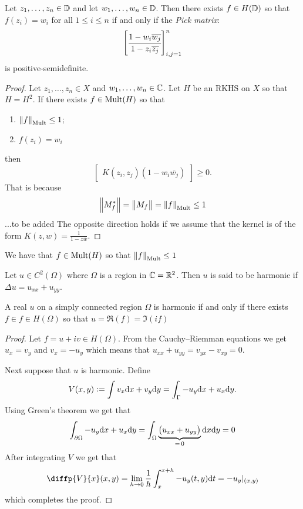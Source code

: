 \documentclass[11pt,a4paper]{article}
\begin{document}
\begin{theorem}
  \label{thm:pick-again}
  Let $z_1,\dots,z_n \in \mathbb{D}$ and let
  $w_1,\dots,w_n \in \mathbb{D}$.
  Then there exists $f \in H(\mathbb{D})$ so that
  $f(z_i) = w_i$ for all $1 \le i \le n$ if and only if
  the \textit{Pick matrix}:
  \[
    \begin{bmatrix}
      \cfrac{1 - w_i \overline{w_j}}{1 - z_i \overline{z_j}}
    \end{bmatrix}_{i,j=1}^{n}
  \]
  is positive-semidefinite.
\end{theorem}
\begin{proof}
  Let $z_1,\dots,z_n \in X$ and $w_1,\dots,w_n \in \mathbb{C}$.
  Let $H$ be an RKHS on $X$ so that $H = H^2$.
  If there exists $f \in \operatorname{Mult}(H)$ so that
  \begin{enumerate}
    \item[(1)] $\left\lVert f\right\rVert_{\operatorname{Mult}} \le 1$;
    \item[(2)] $f(z_i) = w_i$
  \end{enumerate}
  then
  \[
    \begin{bmatrix}
      K(z_i,z_j) (1 - w_i \overline{w_j})
    \end{bmatrix} \geq 0.
  \]
  That is because
  \[
    \left\lVert M_f^*\right\rVert = \left\lVert M_f\right\rVert = \left\lVert f\right\rVert_{\operatorname{Mult}} \le 1
  \]
  ...to be added
  The opposite direction holds if we assume that the kernel is of
  the form $K(z,w) = \frac{1}{1 - z \overline w}$.
\end{proof}

\begin{theorem}
  We have that $f \in \operatorname{Mult}(H)$ so that $\left\lVert f\right\rVert_{\operatorname{Mult}} \le 1$
\end{theorem}

\begin{definition}
  Let $u \in C^2(\Omega)$ where $\Omega$ is a region in $\mathbb{C} = \mathbb{R}^2$.
  Then $u$ is said to be harmonic if $\Delta u = u_{xx} + u_{yy}$.
\end{definition}

\begin{proposition}
  A real $u$ on a simply connected region $\Omega$ is harmonic if and only
  if there exists $f \in f \in H(\Omega)$ so that $u = \Re(f) = \Im(i f)$
\end{proposition}
\begin{proof}
  Let $f = u + iv \in H(\Omega)$.
  From the Cauchy--Riemman equations we get $u_x = v_y$ and $v_x = -u_y$
  which means that $u_{xx} + u_{yy} = v_{yx} - v_{xy} = 0$.

  Next suppose that $u$ is harmonic.
  Define
  \[
    V(x,y) :=
    \int v_x \dx + v_y \dy =
    \int_{\Gamma} -u_y \dx + u_x \dy.
  \]
  Using Green's theorem we get that
  \[
    \int_{\partial \Omega} -u_y \dx + u_x \dy =
    \int_{\Omega} \underbrace{\del{u_{xx} + u_{yy}}}_{=\,0} \dx \dy = 0
  \]
  After integrating $V$ we get that
  \begin{gather*}
    \diffp{V}{x}(x,y) =
    \lim_{h \to 0} \frac{1}{h} \int_{x}^{x+h} -u_{y}(t,y) \dt =
    -u_{y}\vert_{(x,y)}
  \end{gather*}
  which completes the proof.
\end{proof}
\end{document}
